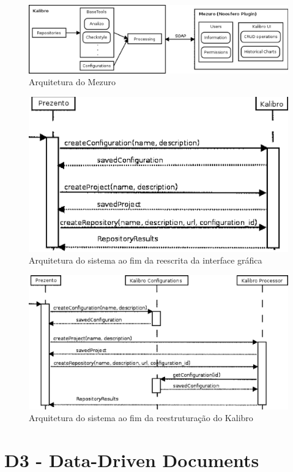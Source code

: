 \begin{figure}[!htb]
	\centering
	\label{mezuroNoosferoArch}
		\includegraphics[keepaspectratio=true,scale=0.5]{figuras/mezuroNoosferoArch.eps}
	\caption{Arquitetura do Mezuro \cite{camarinhaOSS2015}}
\end{figure}

\begin{figure}[h]
	\centering
	\label{prevProcessingSeqDiag}
		\includegraphics[keepaspectratio=true,scale=0.7]{figuras/prevProcessingSeqDiag.eps}
	\caption{Arquitetura do sistema ao fim da reescrita da interface gráfica \cite{meirellesCibse2015}}
\end{figure}

\begin{figure}[h]
	\centering
	\label{processingSeqDiag}
		\includegraphics[keepaspectratio=true,scale=0.5]{figuras/processingSeqDiag.eps}
	\caption{Arquitetura do sistema ao fim da reestruturação do Kalibro \cite{meirellesCibse2015}}
\end{figure}

\newpage

\section{D3 - Data-Driven Documents}

